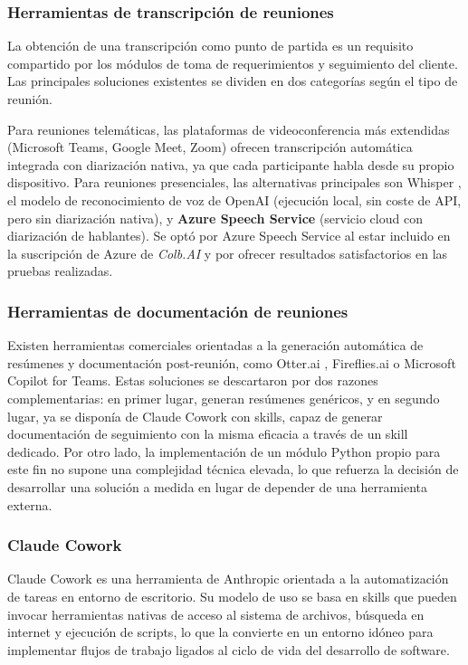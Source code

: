 \documentclass[11pt, letterpaper]{article}
\begin{document}
\subsubsection{Herramientas de transcripción de reuniones}
\label{sec:herramientas_transcripcion}
La obtención de una transcripción como punto de partida es un requisito compartido por los módulos de toma de requerimientos y seguimiento del cliente. Las principales soluciones existentes se dividen en dos categorías según el tipo de reunión.

Para reuniones telemáticas, las plataformas de videoconferencia más extendidas (Microsoft Teams, Google Meet, Zoom) ofrecen transcripción automática integrada con diarización nativa, ya que cada participante habla desde su propio dispositivo. Para reuniones presenciales, las alternativas principales son Whisper \cite{radford2022whisper}, el modelo de reconocimiento de voz de OpenAI (ejecución local, sin coste de API, pero sin diarización nativa), y \textbf{Azure Speech Service} (servicio cloud con diarización de hablantes). Se optó por Azure Speech Service al estar incluido en la suscripción de Azure de \textit{Colb.AI} y por ofrecer resultados satisfactorios en las pruebas realizadas.

\subsubsection{Herramientas de documentación de reuniones}
\label{sec:herramientas_documentacion_reuniones}
Existen herramientas comerciales orientadas a la generación automática de resúmenes y documentación post-reunión, como Otter.ai \cite{otter_ai_2026}, Fireflies.ai \cite{fireflies_ai_2026} o Microsoft Copilot for Teams. Estas soluciones se descartaron por dos razones complementarias: en primer lugar, generan resúmenes genéricos, y en segundo lugar, ya se disponía de Claude Cowork con skills, capaz de generar documentación de seguimiento con la misma eficacia a través de un skill dedicado. Por otro lado, la implementación de un módulo Python propio para este fin no supone una complejidad técnica elevada, lo que refuerza la decisión de desarrollar una solución a medida en lugar de depender de una herramienta externa.

\subsubsection{Claude Cowork}
\label{sec:claude_cowork}
Claude Cowork \cite{anthropic_claude_cowork} es una herramienta de Anthropic orientada a la automatización de tareas en entorno de escritorio. Su modelo de uso se basa en skills que pueden invocar herramientas nativas de acceso al sistema de archivos, búsqueda en internet y ejecución de scripts, lo que la convierte en un entorno idóneo para implementar flujos de trabajo ligados al ciclo de vida del desarrollo de software.
\end{document}
